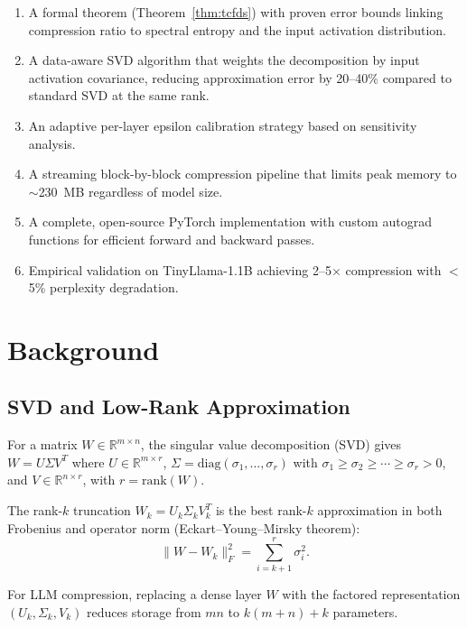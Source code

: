 \documentclass[11pt,a4paper]{article}
\begin{document}
\begin{enumerate}
    \item A formal theorem (Theorem~\ref{thm:tcfds}) with proven error bounds linking compression ratio to spectral entropy and the input activation distribution.
    \item A data-aware SVD algorithm that weights the decomposition by input activation covariance, reducing approximation error by 20--40\% compared to standard SVD at the same rank.
    \item An adaptive per-layer epsilon calibration strategy based on sensitivity analysis.
    \item A streaming block-by-block compression pipeline that limits peak memory to $\sim$230~MB regardless of model size.
    \item A complete, open-source PyTorch implementation with custom autograd functions for efficient forward and backward passes.
    \item Empirical validation on TinyLlama-1.1B achieving 2--5$\times$ compression with $<$5\% perplexity degradation.
\end{enumerate}

\section{Background}

\subsection{SVD and Low-Rank Approximation}

For a matrix $W \in \mathbb{R}^{m \times n}$, the singular value decomposition (SVD) gives $W = U \Sigma V^T$ where $U \in \mathbb{R}^{m \times r}$, $\Sigma = \mathrm{diag}(\sigma_1, \ldots, \sigma_r)$ with $\sigma_1 \geq \sigma_2 \geq \cdots \geq \sigma_r > 0$, and $V \in \mathbb{R}^{n \times r}$, with $r = \mathrm{rank}(W)$.

The rank-$k$ truncation $W_k = U_k \Sigma_k V_k^T$ is the best rank-$k$ approximation in both Frobenius and operator norm (Eckart--Young--Mirsky theorem):
\begin{equation}
    \|W - W_k\|_F^2 = \sum_{i=k+1}^{r} \sigma_i^2.
\end{equation}

For LLM compression, replacing a dense layer $W$ with the factored representation $(U_k, \Sigma_k, V_k)$ reduces storage from $mn$ to $k(m+n) + k$ parameters.
\end{document}
